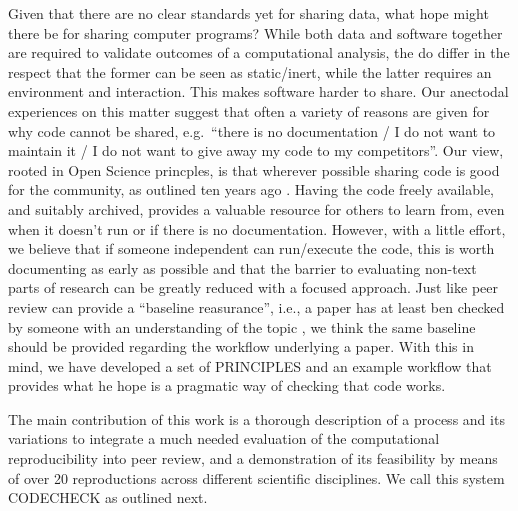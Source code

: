 \documentclass[12pt]{article}
\begin{document}
Given that there are no clear standards yet for sharing data, what hope
might there be for sharing computer programs? While both data and software
together are required to validate outcomes of a computational analysis,
the do differ in the respect that the former can be seen as static/inert,
while the latter requires an environment and interaction. This makes 
software harder to share.
Our anectodal experiences
on this matter suggest that often a variety of reasons are given for why
code cannot be shared, e.g.~``there is no documentation / I do not
want to maintain it / I do not want to give away my code to my
competitors''. Our view, rooted in Open Science princples, is that
wherever possible sharing code is good for the community, as outlined
ten years ago \cite{Barnes2010-iv}. Having the code freely available, and
suitably archived, provides a valuable resource for others to learn
from, even when it doesn't run or if there is no documentation. However,
with a little effort, we believe that if someone independent can run/execute
the code, this is worth documenting as early as possible and that the barrier
to evaluating non-text parts of research can be greatly reduced with a 
focused approach.
Just like peer review can provide a ``baseline reasurance'', i.e., a paper
has at least ben checked by someone with an understanding of the topic
\cite{fyfe_mission_2019}, we think the same baseline should be provided
regarding the workflow underlying a paper.
With this in mind, we have developed a set of PRINCIPLES and an example 
workflow that provides what he hope is a pragmatic way of checking that 
code works.

The main contribution of this work is a thorough description of a process
and its variations to integrate a much needed evaluation of the 
computational reproducibility \cite{barba_terminologies_2018} into peer
review, and a demonstration of its feasibility by means of over 20
reproductions across different scientific disciplines.
We call this system CODECHECK as outlined next.
\end{document}
